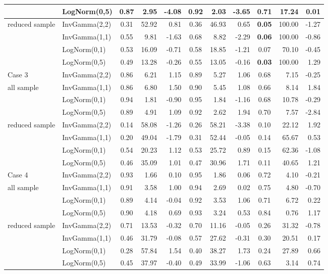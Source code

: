 \documentclass{amsart}
\begin{document}
\begin{table}[ht]
{\begin{tabular}{ll|crr|crr|crr}
			& LogNorm(0,5) & 0.87 & 2.95 & -4.08 & 0.92 & 2.03 & -3.65 & 0.71 & 17.24 & 0.01 \\ 
			\midrule
			reduced sample & InvGamma(2,2) & 0.31 & 52.92 & 0.81 & 0.36 & 46.93 & 0.65 & \textbf{0.05} & 100.00 & -1.27 \\ 
			& InvGamma(1,1) & 0.55 & 9.81 & -1.63 & 0.68 & 8.82 & -2.29 & \textbf{0.06} & 100.00 & -0.86 \\ 
			& LogNorm(0,1) & 0.53 & 16.09 & -0.71 & 0.58 & 18.85 & -1.21 & 0.07 & 70.10 & -0.45 \\ 
			& LogNorm(0,5) & 0.49 & 13.28 & -0.26 & 0.55 & 13.05 & -0.16 & \textbf{0.03} & 100.00 & 1.29 \\ 
			\midrule
			Case 3 & InvGamma(2,2) & 0.86 & 6.21 & 1.15 & 0.89 & 5.27 & 1.06 & 0.68 & 7.15 & -0.25 \\ 
			all sample & InvGamma(1,1) & 0.86 & 6.80 & 1.50 & 0.90 & 5.45 & 1.08 & 0.66 & 8.14 & 1.84 \\ 
			& LogNorm(0,1) & 0.94 & 1.81 & -0.90 & 0.95 & 1.84 & -1.16 & 0.68 & 10.78 & -0.29 \\ 
			& LogNorm(0,5) & 0.89 & 4.91 & 1.09 & 0.92 & 2.62 & 1.94 & 0.70 & 7.57 & -2.84 \\ 
			\midrule
			reduced sample & InvGamma(2,2) & 0.14 & 58.08 & -1.26 & 0.26 & 58.21 & -3.38 & 0.10 & 22.12 & 1.92 \\ 
			& InvGamma(1,1) & 0.20 & 49.04 & -1.79 & 0.31 & 52.44 & -0.05 & 0.14 & 65.67 & 0.53 \\ 
			& LogNorm(0,1) & 0.54 & 20.23 & 1.12 & 0.53 & 25.72 & 0.89 & 0.15 & 62.36 & -1.08 \\ 
			& LogNorm(0,5) & 0.46 & 35.09 & 1.01 & 0.47 & 30.96 & 1.71 & 0.11 & 40.65 & 1.21 \\ 
			\midrule
			Case 4 & InvGamma(2,2) & 0.93 & 1.66 & 0.10 & 0.95 & 1.86 & 0.06 & 0.72 & 4.10 & -0.21 \\ 
			all sample & InvGamma(1,1) & 0.91 & 3.58 & 1.00 & 0.94 & 2.69 & 0.02 & 0.75 & 4.80 & -0.70 \\ 
			& LogNorm(0,1) & 0.89 & 4.14 & -0.04 & 0.92 & 3.53 & 1.06 & 0.71 & 6.72 & 0.22 \\ 
			& LogNorm(0,5) & 0.90 & 4.18 & 0.69 & 0.93 & 3.24 & 0.53 & 0.84 & 0.76 & 1.17 \\ 
			\midrule
			reduced sample & InvGamma(2,2) & 0.71 & 13.53 & -0.32 & 0.70 & 11.16 & -0.05 & 0.26 & 31.32 & -0.78 \\ 
			& InvGamma(1,1) & 0.46 & 31.79 & -0.08 & 0.57 & 27.62 & -0.31 & 0.30 & 20.51 & 0.17 \\ 
			& LogNorm(0,1) & 0.28 & 57.84 & 1.54 & 0.40 & 38.27 & 1.73 & 0.24 & 27.89 & 0.66 \\ 
			& LogNorm(0,5) & 0.45 & 37.97 & -0.40 & 0.49 & 33.99 & -1.06 & 0.63 & 3.14 & 0.74 \\ 
			\bottomrule
	\end{tabular}}
\end{table}
\end{document}
